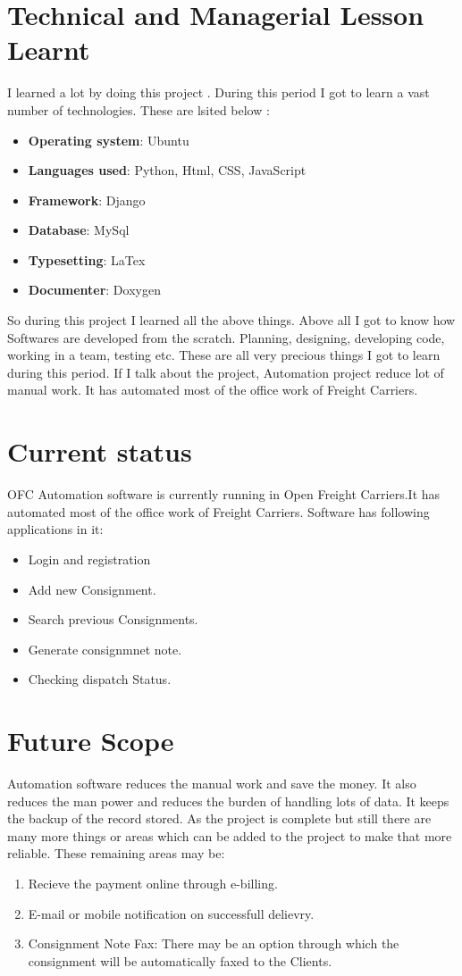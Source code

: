 \section{Technical and Managerial Lesson Learnt}
I learned a lot by doing this project . During this period I got to learn a vast 
number of technologies. These are lsited below :
\begin{itemize}
\item {\bf{Operating system}}: Ubuntu
\item {\bf{Languages used}}: Python, Html, CSS, JavaScript
\item {\bf{Framework}}: Django 
\item {\bf{Database}}: MySql
\item {\bf{Typesetting}}: LaTex
\item {\bf{Documenter}}: Doxygen

\end{itemize}
So during this project I learned all the above things. Above all I got to know 
how Softwares are developed from the scratch. Planning, designing, developing code, 
working in a team, testing etc. These are all very precious things I got to learn 
during this period. If I talk about the project, Automation project reduce lot of 
manual work. It has automated most of the office work of Freight Carriers.  

\section{Current status}
OFC Automation software is currently running in Open Freight Carriers.It has 
automated most of the office work of Freight Carriers.
Software has following applications in it:
\begin{itemize}
\item Login and registration
\item Add new Consignment.
\item Search previous Consignments.
\item Generate consignmnet note.
\item Checking dispatch Status.
\end{itemize}
 
\section{Future Scope}
Automation software reduces the manual work and save the money. It also reduces 
the man power and reduces the burden of handling lots of data. It keeps the backup 
of the record stored. As the project is complete but still there are many more 
things or areas which can be added to the project to make that more reliable. 
These remaining areas may be:
\begin{enumerate}
\item Recieve the payment online through e-billing.
\item E-mail or mobile notification on successfull delievry.
\item Consignment Note Fax: There may be an option through which the consignment 
will be automatically faxed to the Clients.
\end{enumerate}


